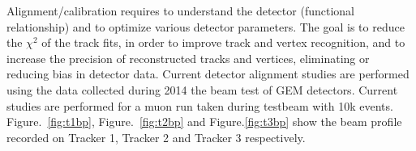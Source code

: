 Alignment/calibration requires to understand the detector (functional relationship) and to optimize various detector  parameters. The goal is to reduce the $\chi^{2}$ of the track fits, in order to improve track and vertex recognition, and to increase the precision of reconstructed tracks and vertices, eliminating or reducing bias in detector data.
Current detector alignment studies are performed using the data collected during 2014 the beam test of GEM detectors. 
Current studies are performed for a muon run taken during testbeam with 10k events.
Figure.~\ref{fig:t1bp}, Figure.~\ref{fig:t2bp} and Figure.\ref{fig:t3bp} show the beam profile recorded on Tracker 1, Tracker 2 and Tracker 3 respectively. 
